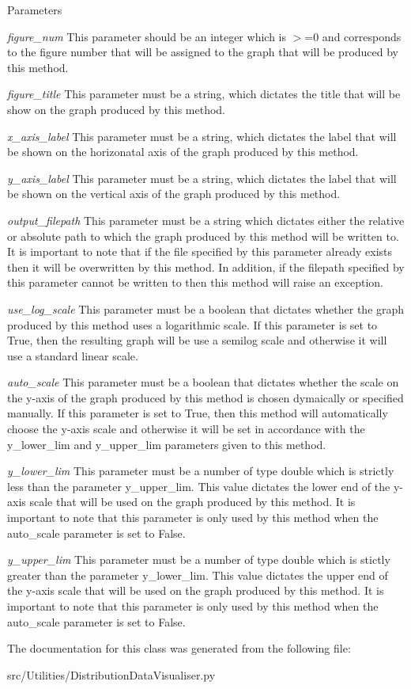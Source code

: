 \begin{DoxyParams}{Parameters}
\item[{\em figure\_\-num}]This parameter should be an integer which is $>$=0 and corresponds to the figure number that will be assigned to the graph that will be produced by this method. \item[{\em figure\_\-title}]This parameter must be a string, which dictates the title that will be show on the graph produced by this method. \item[{\em x\_\-axis\_\-label}]This parameter must be a string, which dictates the label that will be shown on the horizonatal axis of the graph produced by this method. \item[{\em y\_\-axis\_\-label}]This parameter must be a string, which dictates the label that will be shown on the vertical axis of the graph produced by this method. \item[{\em output\_\-filepath}]This parameter must be a string which dictates either the relative or absolute path to which the graph produced by this method will be written to. It is important to note that if the file specified by this parameter already exists then it will be overwritten by this method. In addition, if the filepath specified by this parameter cannot be written to then this method will raise an exception. \item[{\em use\_\-log\_\-scale}]This parameter must be a boolean that dictates whether the graph produced by this method uses a logarithmic scale. If this parameter is set to True, then the resulting graph will be use a semilog scale and otherwise it will use a standard linear scale. \item[{\em auto\_\-scale}]This parameter must be a boolean that dictates whether the scale on the y-\/axis of the graph produced by this method is chosen dymaically or specified manually. If this parameter is set to True, then this method will automatically choose the y-\/axis scale and otherwise it will be set in accordance with the y\_\-lower\_\-lim and y\_\-upper\_\-lim parameters given to this method. \item[{\em y\_\-lower\_\-lim}]This parameter must be a number of type double which is strictly less than the parameter y\_\-upper\_\-lim. This value dictates the lower end of the y-\/axis scale that will be used on the graph produced by this method. It is important to note that this parameter is only used by this method when the auto\_\-scale parameter is set to False. \item[{\em y\_\-upper\_\-lim}]This parameter must be a number of type double which is stictly greater than the parameter y\_\-lower\_\-lim. This value dictates the upper end of the y-\/axis scale that will be used on the graph produced by this method. It is important to note that this parameter is only used by this method when the auto\_\-scale parameter is set to False. \end{DoxyParams}


The documentation for this class was generated from the following file:\begin{DoxyCompactItemize}
\item 
src/Utilities/DistributionDataVisualiser.py\end{DoxyCompactItemize}

